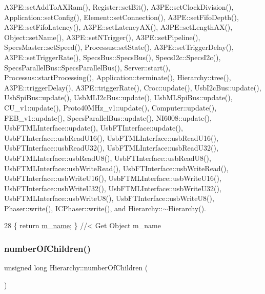 A3\+P\+E\+::set\+Add\+To\+A\+X\+Ram(), Register\+::set\+Bit(), A3\+P\+E\+::set\+Clock\+Division(), Application\+::set\+Config(), Element\+::set\+Connection(), A3\+P\+E\+::set\+Fifo\+Depth(), A3\+P\+E\+::set\+Fifo\+Latency(), A3\+P\+E\+::set\+Latency\+A\+X(), A3\+P\+E\+::set\+Length\+A\+X(), Object\+::set\+Name(), A3\+P\+E\+::set\+N\+Trigger(), A3\+P\+E\+::set\+Pipeline(), Specs\+Master\+::set\+Speed(), Processus\+::set\+State(), A3\+P\+E\+::set\+Trigger\+Delay(), A3\+P\+E\+::set\+Trigger\+Rate(), Specs\+Bus\+::\+Specs\+Bus(), Specs\+I2c\+::\+Specs\+I2c(), Specs\+Parallel\+Bus\+::\+Specs\+Parallel\+Bus(), Server\+::start(), Processus\+::start\+Processing(), Application\+::terminate(), Hierarchy\+::tree(), A3\+P\+E\+::trigger\+Delay(), A3\+P\+E\+::trigger\+Rate(), Croc\+::update(), Usb\+I2c\+Bus\+::update(), Usb\+Spi\+Bus\+::update(), Usb\+M\+L\+I2c\+Bus\+::update(), Usb\+M\+L\+Spi\+Bus\+::update(), C\+U\+\_\+v1\+::update(), Proto40\+M\+Hz\+\_\+v1\+::update(), Computer\+::update(), F\+E\+B\+\_\+v1\+::update(), Specs\+Parallel\+Bus\+::update(), N\+I6008\+::update(), Usb\+F\+T\+M\+L\+Interface\+::update(), Usb\+F\+T\+Interface\+::update(), Usb\+F\+T\+Interface\+::usb\+Read\+U16(), Usb\+F\+T\+M\+L\+Interface\+::usb\+Read\+U16(), Usb\+F\+T\+Interface\+::usb\+Read\+U32(), Usb\+F\+T\+M\+L\+Interface\+::usb\+Read\+U32(), Usb\+F\+T\+M\+L\+Interface\+::usb\+Read\+U8(), Usb\+F\+T\+Interface\+::usb\+Read\+U8(), Usb\+F\+T\+M\+L\+Interface\+::usb\+Write\+Read(), Usb\+F\+T\+Interface\+::usb\+Write\+Read(), Usb\+F\+T\+Interface\+::usb\+Write\+U16(), Usb\+F\+T\+M\+L\+Interface\+::usb\+Write\+U16(), Usb\+F\+T\+Interface\+::usb\+Write\+U32(), Usb\+F\+T\+M\+L\+Interface\+::usb\+Write\+U32(), Usb\+F\+T\+M\+L\+Interface\+::usb\+Write\+U8(), Usb\+F\+T\+Interface\+::usb\+Write\+U8(), Phaser\+::write(), I\+C\+Phaser\+::write(), and Hierarchy\+::$\sim$\+Hierarchy().


\begin{DoxyCode}
28 \{ \textcolor{keywordflow}{return} \hyperlink{classObject_a8b83c95c705d2c3ba0d081fe1710f48d}{m\_name}; \} \textcolor{comment}{//< Get Object m\_name}
\end{DoxyCode}
\mbox{\label{classHierarchy_ab16e84de65fd84e14001a6cf941c8be4}} 
\subsubsection{\texorpdfstring{number\+Of\+Children()}{numberOfChildren()}}
{\footnotesize\ttfamily unsigned long Hierarchy\+::number\+Of\+Children (\begin{DoxyParamCaption}{ }\end{DoxyParamCaption})\hspace{0.3cm}{\ttfamily [inherited]}}




